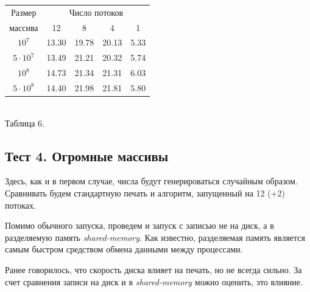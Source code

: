 \begin{center}
\begin{tabular}{||c|c|c|c|c||}
\hline
\hline
Размер & \multicolumn{4}{c|}{Число потоков}\\
\hhline{~|-|-|-|-|}
массива & 12 & 8 & 4 & 1 \\
\hline
$10^7$  & 13.30 & 19.78 & 20.13 & 5.33 \\
\hline
$5 \cdot 10^7$ & 13.49 & 21.21 & 20.32 & 5.74 \\
\hline
$10^8$ &14.73 & 21.34 & 21.31 & 6.03 \\
\hline
$5 \cdot 10^8$ &14.40 & 21.98 & 21.81 & 5.80 \\
\hline
\hline
\end{tabular}
\\
\vspace{14pt}
\small{Таблица 6.}
\end{center}

\subsection{Тест 4. Огромные массивы} \label{subsec2:3}
Здесь, как и в первом случае, числа будут генерироваться случайным образом.
Сравнивать будем стандартную печать и алгоритм, запущенный на 12 (+2) потоках.

Помимо обычного запуска, проведем и запуск с записью не на диск, а в разделяемую память \textit{shared-memory}.
Как известно, разделяемая память является самым быстром средством обмена данными между процессами.

Ранее говорилось, что скорость диска влияет на печать, но не всегда сильно.
За счет сравнения записи на диск и в \textit{shared-memory} можно оценить, это влияние.

